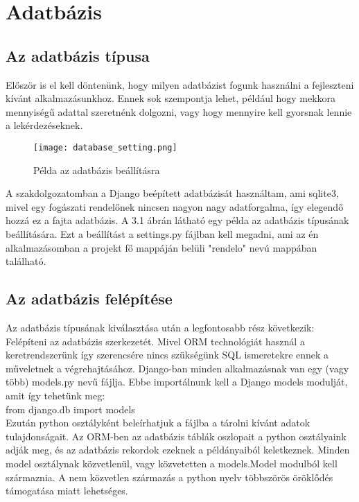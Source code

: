 \chapter{Adatbázis}
\label{chap:fejezet3}

\section{Az adatbázis típusa}
Először is el kell döntenünk, hogy milyen adatbázist fogunk használni a fejleszteni kívánt alkalmazásunkhoz. Ennek sok szempontja lehet, például hogy mekkora mennyiségű adattal szeretnénk dolgozni, vagy hogy mennyire kell gyorsnak lennie a lekérdezéseknek.

\begin{figure}[H]
	\caption{Példa az adatbázis beállításra}
	\label{fig:adatbazisbeallitas}
	\centering
	\texttt{[image: database\_setting.png]}
\end{figure}

A szakdolgozatomban a Django beépített adatbázisát használtam, ami sqlite3, mivel egy fogászati rendelőnek nincsen nagyon nagy adatforgalma, így elegendő hozzá ez a fajta adatbázis. A 3.1 ábrán látható egy példa az adatbázis típusának beállítására. Ezt a beállítást a settings.py fájlban kell megadni, ami az én alkalmazásomban a projekt fő mappáján belüli "rendelo" nevú mappában található.

\section{Az adatbázis felépítése}
Az adatbázis típusának kiválasztása után a legfontosabb rész következik: Felépíteni az adatbázis szerkezetét. Mivel ORM technológiát használ a keretrendszerünk így szerencsére nincs szükségünk SQL ismeretekre ennek a műveletnek a végrehajtásához. Django-ban minden alkalmazásnak van egy (vagy több) models.py nevű fájlja. Ebbe importálnunk kell a Django models modulját, amit így tehetünk meg:\\
from django.db import models\\
Ezután python osztályként beleírhatjuk a fájlba a tárolni kívánt adatok tulajdonságait. Az ORM-ben az adatbázis táblák oszlopait a python osztályaink adják meg, és az adatbázis rekordok ezeknek a példányaiból keletkeznek. Minden model osztálynak közvetlenül, vagy közvetetten a models.Model modulból kell származnia. A nem közvetlen származás a python nyelv többszörös öröklődés támogatása miatt lehetséges.

